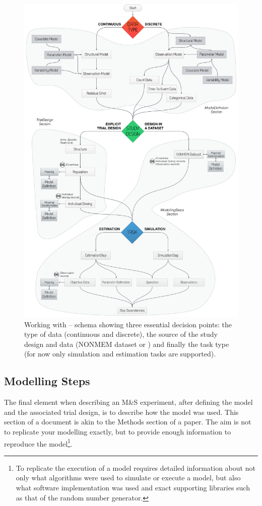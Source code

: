 \begin{figure}[htb!]
 \centering
  \includegraphics[height=0.90\textheight]{pics/Flowchart-dataTypeStudyTask}
  \caption{Working with \pharmml -- schema showing three essential decision points:
  the type of data (continuous and discrete), the source of the study design and data 
  (NONMEM dataset or ) and finally the task type 
  (for now only simulation and estimation tasks are supported).}
  \label{fig:dataStudyTaskFlow}
\end{figure}

\subsection{Modelling Steps}
\label{sec:stepdeps}
The final element when describing an M\&S experiment, after defining
the model and the associated trial design, is to describe how the
model was used. This section of a \pharmml document is akin to the
Methods section of a paper. The aim is not to replicate your modelling
exactly, but to provide enough information to reproduce the
model\footnote{To replicate the execution of a model requires detailed
  information about not only what algorithms were used to simulate or
  execute a model, but also what software implementation was used and
  exact supporting libraries such as that of the random number
  generator.}.

